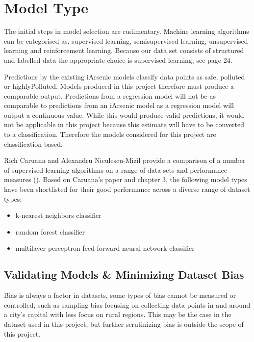 \section{Model Type}
\label{mt}

The initial steps in model selection are rudimentary. Machine learning algorithms can be categorised as, supervised learning, semisupervised learning, unsupervised learning and reinforcement learning. Because our data set consists of structured and labelled data the appropriate choice is supervised learning, see \cite{Aurélien2017} page 24.

Predictions by the existing iArsenic models classify data points as safe, polluted or highlyPolluted. Models produced in this project therefore must produce a comparable output. Predictions from a regression model will not be as comparable to predictions from an iArsenic model as a regression model will output a continuous value. While this would produce valid predictions, it would not be applicable in this project because this estimate will have to be converted to a classification. Therefore the models considered for this project are classification based.


Rich Caruana and Alexandru Niculescu-Mizil provide a comparison of a number of supervised learning algorithms on a range of data sets and performance measures (\cite{Caruana2006}). Based on Caruana's paper and \cite{Aurélien2017} chapter 3, the following model types have been shortlisted for their good performance across a diverse range of dataset types:
\begin{itemize}
    \item k-nearest neighbors classifier
    \item random forest classifier
    \item multilayer perceptron feed forward neural network classifier
\end{itemize}

\subsection{Validating Models \& Minimizing Dataset Bias}
\label{eval}

Bias is always a factor in datasets, some types of bias cannot be measured or controlled, such as sampling bias focusing on collecting data points in and around a city's capital with less focus on rural regions. This may be the case in the dataset used in this project, but further scrutinizing bias is outside the scope of this project. 

